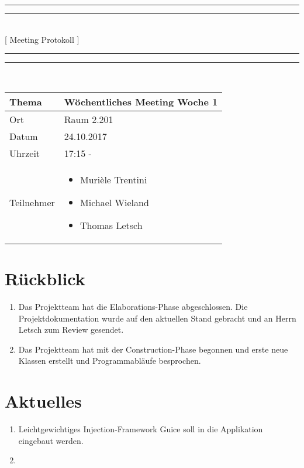 \documentclass[11pt, a4paper,oneside]{scrartcl}
\begin{document}
\centering
\rule{\textwidth}{1.6pt}\vspace*{-\baselineskip}\vspace*{2pt} %
\rule{\textwidth}{0.4pt}\\[\baselineskip] %
{\LARGE [ Meeting Protokoll ]}\\[0.2\baselineskip] %
\rule{\textwidth}{0.4pt}\vspace*{-\baselineskip}\vspace{3.2pt} %
\rule{\textwidth}{1.6pt}\\[2\baselineskip] %

\begin{tabu} to \linewidth {l X }
	\toprule
	\textbf{Thema} & \textbf{Wöchentliches Meeting Woche 1} \\
	\midrule
	Ort & Raum 2.201 \\
	Datum & 24.10.2017  \\
	Uhrzeit &  17:15 -  \\
	Teilnehmer & 
	\begin{minipage}[t]{\textwidth}
	  	\begin{itemize}
			\item Murièle Trentini
			\item Michael Wieland
			\item Thomas Letsch
	  	\end{itemize}
	\end{minipage}
	\\
	\bottomrule
\end{tabu}


\section{Rückblick}
\begin{enumerate}
	\item Das Projektteam hat die Elaborations-Phase abgeschlossen. Die Projektdokumentation wurde auf den aktuellen Stand gebracht und an Herrn Letsch zum Review gesendet.
	\item Das Projektteam hat mit der Construction-Phase begonnen und erste neue Klassen erstellt und Programmabläufe besprochen.
\end{enumerate}

\section{Aktuelles}
\begin{enumerate}
	\item Leichtgewichtiges Injection-Framework Guice soll in die Applikation eingebaut werden.
	\item 
\end{enumerate}
\end{document}
